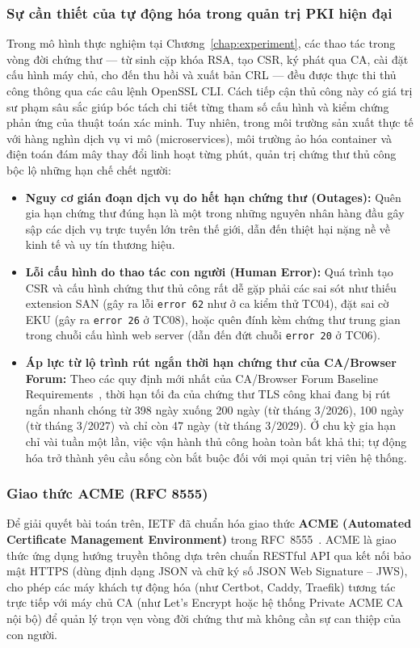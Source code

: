 \subsubsection{Sự cần thiết của tự động hóa trong quản trị PKI hiện đại}
Trong mô hình thực nghiệm tại Chương~\ref{chap:experiment}, các thao tác trong vòng đời chứng thư --- từ sinh cặp khóa RSA, tạo CSR, ký phát qua CA, cài đặt cấu hình máy chủ, cho đến thu hồi và xuất bản CRL --- đều được thực thi thủ công thông qua các câu lệnh OpenSSL CLI. Cách tiếp cận thủ công này có giá trị sư phạm sâu sắc giúp bóc tách chi tiết từng tham số cấu hình và kiểm chứng phản ứng của thuật toán xác minh. Tuy nhiên, trong môi trường sản xuất thực tế với hàng nghìn dịch vụ vi mô (microservices), môi trường ảo hóa container và điện toán đám mây thay đổi linh hoạt từng phút, quản trị chứng thư thủ công bộc lộ những hạn chế chết người:
\begin{itemize}
    \item \textbf{Nguy cơ gián đoạn dịch vụ do hết hạn chứng thư (Outages):} Quên gia hạn chứng thư đúng hạn là một trong những nguyên nhân hàng đầu gây sập các dịch vụ trực tuyến lớn trên thế giới, dẫn đến thiệt hại nặng nề về kinh tế và uy tín thương hiệu.
    \item \textbf{Lỗi cấu hình do thao tác con người (Human Error):} Quá trình tạo CSR và cấu hình chứng thư thủ công rất dễ gặp phải các sai sót như thiếu extension SAN (gây ra lỗi \texttt{error 62} như ở ca kiểm thử TC04), đặt sai cờ EKU (gây ra \texttt{error 26} ở TC08), hoặc quên đính kèm chứng thư trung gian trong chuỗi cấu hình web server (dẫn đến đứt chuỗi \texttt{error 20} ở TC06).
    \item \textbf{Áp lực từ lộ trình rút ngắn thời hạn chứng thư của CA/Browser Forum:} Theo các quy định mới nhất của CA/Browser Forum Baseline Requirements~\cite{cabforum_br}, thời hạn tối đa của chứng thư TLS công khai đang bị rút ngắn nhanh chóng từ 398 ngày xuống 200 ngày (từ tháng 3/2026), 100 ngày (từ tháng 3/2027) và chỉ còn 47 ngày (từ tháng 3/2029). Ở chu kỳ gia hạn chỉ vài tuần một lần, việc vận hành thủ công hoàn toàn bất khả thi; tự động hóa trở thành yêu cầu sống còn bắt buộc đối với mọi quản trị viên hệ thống.
\end{itemize}

\subsubsection{Giao thức ACME (RFC 8555)}
Để giải quyết bài toán trên, IETF đã chuẩn hóa giao thức \textbf{ACME (Automated Certificate Management Environment)} trong RFC~8555~\cite{rfc8555}. ACME là giao thức ứng dụng hướng truyền thông dựa trên chuẩn RESTful API qua kết nối bảo mật HTTPS (dùng định dạng JSON và chữ ký số JSON Web Signature -- JWS), cho phép các máy khách tự động hóa (như Certbot, Caddy, Traefik) tương tác trực tiếp với máy chủ CA (như Let's Encrypt hoặc hệ thống Private ACME CA nội bộ) để quản lý trọn vẹn vòng đời chứng thư mà không cần sự can thiệp của con người.

